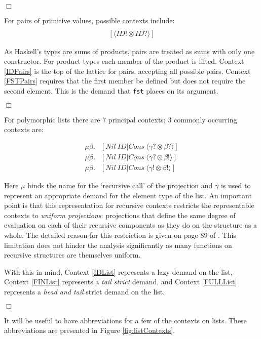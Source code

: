 \hfill$\Box$

For pairs of primitive values, possible contexts include:
\begin{align}
[\langle ID? \otimes ID? \rangle] \label{IDPairs} \\
[\langle ID! \otimes ID? \rangle] \label{FSTPairs}
\end{align}


As Haskell's types are sums of products, pairs are treated as sums with only
one constructor.  For product types each member of the product is lifted.
Context \ref{IDPairs} is the top of the lattice for pairs, accepting all
possible pairs. Context \ref{FSTPairs} requires that the first member be
defined but does not require the second element. This is the demand that
\verb-fst- places on its argument.

\hfill$\Box$

\pagebreak
For polymorphic lists there are 7 principal contexts; 3 commonly occurring contexts are:

\begin{align}
    \mu\beta.&[Nil\ ID | Cons\ \langle \gamma? \otimes \beta?\rangle] \label{IDList} \\
    \mu\beta.&[Nil\ ID | Cons\ \langle \gamma? \otimes \beta!\rangle] \label{FINList} \\
    \mu\beta.&[Nil\ ID | Cons\ \langle \gamma! \otimes \beta!\rangle] \label{FULLList}
\end{align}


Here $\mu$ binds the name for the `recursive call' of the projection and
$\gamma$ is used to represent an appropriate demand for the element type of the
list.  An important point is that this representation for recursive contexts
restricts the representable contexts to \emph{uniform projections}: projections
that define the same degree of evaluation on each of their recursive components
as they do on the structure as a whole. The detailed reason for this
restriction is given on page 89 of \cite{hinze1995projection}. This limitation
does not hinder the analysis significantly as many functions on recursive
structures are themselves uniform.

With this in mind, Context \ref{IDList} represents a lazy demand on the list,
Context \ref{FINList} represents a \emph{tail strict} demand, and Context
\ref{FULLList} represents a \emph{head and tail} strict demand on the list.

\hfill$\Box$

It will be useful to have abbreviations for a few of the contexts on lists. These
abbreviations are presented in Figure \ref{fig:listContexts}.


